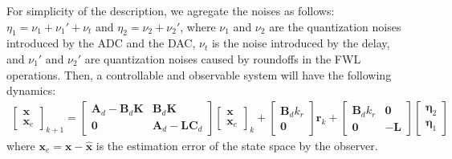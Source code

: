 \documentclass[sigconf]{llncs}
\newcommand{\mat}[1]{\boldsymbol{#1}}
\renewcommand{\vec}[1]{\boldsymbol{#1}}
\begin{document}
For simplicity of the description, we agregate the noises as follows:
$\eta_1=\nu_1+\nu_1'+\nu_t$ and $\eta_2=\nu_2+\nu_2'$,
where $\nu_1$ and $\nu_2$ are the quantization noises introduced by the ADC and the DAC, $\nu_t$ is the noise introduced by the delay, and $\nu_1'$ and $\nu_2'$ are quantization noises caused by roundoffs in the FWL operations.
Then, a controllable and observable system will have the following dynamics:
\begin{align}
\scriptstyle
\left [\begin{array}{c}\vec{x}\\ \vec{x}_e \end{array}\right]_{k+1}
=\left [\begin{array}{cc}\mat{A}_d-\mat{B}_d\mat{K}&\mat{B}_d\mat{K}\\ \mat{0}&\mat{A}_d-\mat{L}\mat{C}_d\end{array}\right]
\left [\begin{array}{c}\vec{x}\\ \vec{x}_e \end{array}\right]_k
+\left [\begin{array}{c}\mat{B}_dk_r\\ \mat{0} \end{array}\right] \vec{r}_k
+\left [\begin{array}{cc}\mat{B}_dk_r&\mat{0}\\ \mat{0}&-\mat{L}\end{array}\right]\left [\begin{array}{c}\vec{\eta}_2\\ \vec{\eta}_1\end{array}\right]
\label{eq:observer_LTI}
\end{align}
where $\vec{x}_e=\vec{x}-\hat{\vec{x}}$ is the estimation error of the state space by the observer.
\end{document}

